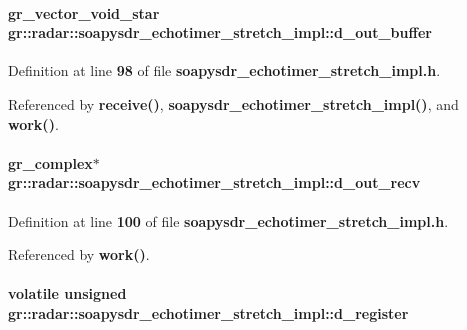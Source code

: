 \paragraph[{d\+\_\+out\+\_\+buffer}]{\setlength{\rightskip}{0pt plus 5cm}gr\+\_\+vector\+\_\+void\+\_\+star gr\+::radar\+::soapysdr\+\_\+echotimer\+\_\+stretch\+\_\+impl\+::d\+\_\+out\+\_\+buffer\hspace{0.3cm}{\ttfamily [private]}}\label{classgr_1_1radar_1_1soapysdr__echotimer__stretch__impl_a77a25a3a3b5c63dc9be44738ee6cd783}


Definition at line {\bf 98} of file {\bf soapysdr\+\_\+echotimer\+\_\+stretch\+\_\+impl.\+h}.



Referenced by {\bf receive()}, {\bf soapysdr\+\_\+echotimer\+\_\+stretch\+\_\+impl()}, and {\bf work()}.

\paragraph[{d\+\_\+out\+\_\+recv}]{\setlength{\rightskip}{0pt plus 5cm}gr\+\_\+complex$\ast$ gr\+::radar\+::soapysdr\+\_\+echotimer\+\_\+stretch\+\_\+impl\+::d\+\_\+out\+\_\+recv\hspace{0.3cm}{\ttfamily [private]}}\label{classgr_1_1radar_1_1soapysdr__echotimer__stretch__impl_a566ad07c0d9e86c63ece9015435ab06a}


Definition at line {\bf 100} of file {\bf soapysdr\+\_\+echotimer\+\_\+stretch\+\_\+impl.\+h}.



Referenced by {\bf work()}.

\paragraph[{d\+\_\+register}]{\setlength{\rightskip}{0pt plus 5cm}volatile unsigned gr\+::radar\+::soapysdr\+\_\+echotimer\+\_\+stretch\+\_\+impl\+::d\+\_\+register\hspace{0.3cm}{\ttfamily [private]}}\label{classgr_1_1radar_1_1soapysdr__echotimer__stretch__impl_af967d6c14ad3036fe887cb57a1dd1cea}


